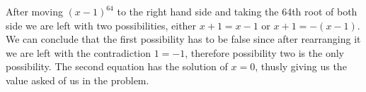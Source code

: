 \documentclass{article}
\theoremstyle{maintheorem}
\begin{document}
After moving $(x - 1)^{64}$ to the right hand side and taking the 64th root of both side we are left with two possibilities,
either $x + 1 = x - 1$ or $x + 1 = -(x - 1)$. We can conclude that the first possibility has to be false since after rearranging it we are left with the contradiction $1 = -1$, therefore possibility two is the only possibility.
The second equation has the solution of $x = 0$, thusly giving us the value asked of us in the problem.
\end{document}
